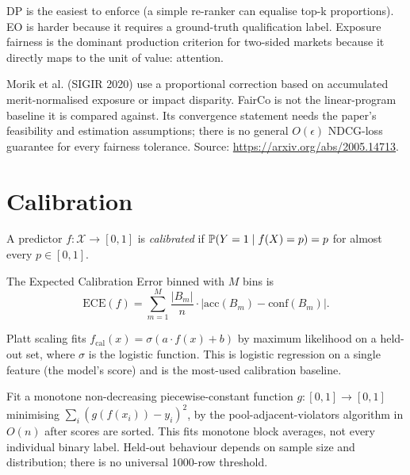 \documentclass[11pt,oneside]{scrbook}
\newcommand{\ECE}{\mathrm{ECE}}
\begin{document}
DP is the easiest to enforce (a simple re-ranker can equalise top-k
proportions). EO is harder because it requires a ground-truth
qualification label. Exposure fairness is the dominant production criterion
for two-sided markets because it directly maps to the unit of value:
attention.

\begin{remark}
Morik et al. (SIGIR 2020) use a proportional correction based on accumulated
merit-normalised exposure or impact disparity. FairCo is not the linear-program
baseline it is compared against. Its convergence statement needs the paper's
feasibility and estimation assumptions; there is no general $O(\epsilon)$
NDCG-loss guarantee for every fairness tolerance.
Source: \url{https://arxiv.org/abs/2005.14713}.
\end{remark}

\section{Calibration}

\begin{definition}[Calibration]
A predictor $f: \mathcal{X} \to [0, 1]$ is \emph{calibrated} if
$\mathbb{P}(Y = 1 \mid f(X) = p) = p$ for almost every $p \in [0,1]$.
\end{definition}

\begin{definition}[ECE]
The Expected Calibration Error binned with $M$ bins is
\[
\ECE(f) = \sum_{m=1}^M \frac{|B_m|}{n} \cdot \big|\mathrm{acc}(B_m) - \mathrm{conf}(B_m)\big|.
\]
\end{definition}

\begin{theorem}
Platt scaling fits $f_{\mathrm{cal}}(x) = \sigma(a \cdot f(x) + b)$ by
maximum likelihood on a held-out set, where $\sigma$ is the logistic
function. This is logistic regression on a single feature (the model's
score) and is the most-used calibration baseline.
\end{theorem}

\begin{theorem}
Fit a monotone non-decreasing piecewise-constant function $g: [0,1] \to [0,1]$
minimising $\sum_i (g(f(x_i)) - y_i)^2$, by the pool-adjacent-violators
algorithm in $O(n)$ after scores are sorted. This fits monotone block
averages, not every individual binary label. Held-out behaviour depends on
sample size and distribution; there is no universal 1000-row threshold.
\end{theorem}
\end{document}

